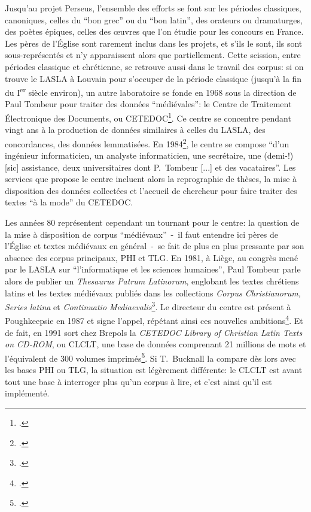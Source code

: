 Jusqu'au projet Perseus, l'ensemble des efforts se font sur les périodes classiques, canoniques, celles du \enquote{bon grec} ou du \enquote{bon latin}, des orateurs ou dramaturges, des poètes épiques, celles des œuvres que l'on étudie pour les concours en France. Les pères de l'Église sont rarement inclus dans les projets, et s'ils le sont, ils sont sous-représentés et n'y apparaissent alors que partiellement. Cette scission, entre périodes classique et chrétienne, se retrouve aussi dans le travail des corpus: si on trouve le LASLA à Louvain pour s'occuper de la période classique (jusqu'à la fin du I\textsuperscript{er} siècle environ), un autre laboratoire se fonde en 1968 sous la direction de Paul Tombeur pour traiter des données \enquote{médiévales}: le Centre de Traitement Électronique des Documents, ou CETEDOC\footcite[p. 70]{gueret_analyse_1977}. Ce centre se concentre pendant vingt ans à la production de données similaires à celles du LASLA, des concordances, des données lemmatisées. En 1984\footcite{iogna-prat_centre_1984}, le centre se compose \enquote{d'un ingénieur informaticien, un analyste informaticien, une secrétaire, une (demi-!) {[sic]} assistance, deux universitaires dont P.~Tombeur {[...]} et des vacataires}. Les services que propose le centre incluent alors la reprographie de thèses, la mise à disposition des données collectées et l'accueil de chercheur pour faire traiter des textes \enquote{à la mode} du CETEDOC.

Les années 80 représentent cependant un tournant pour le centre: la question de la mise à disposition de corpus \enquote{médiévaux}~-~il faut entendre ici pères de l'Église et textes médiévaux en général~-~se fait de plus en plus pressante par son absence des corpus principaux, PHI et TLG. En 1981, à Liège, au congrès mené par le LASLA sur \enquote{l'informatique et les sciences humaines}, Paul Tombeur parle alors de publier un \textit{Thesaurus Patrum Latinorum}, englobant les textes chrétiens latins et les textes médiévaux publiés dans les collections \textit{Corpus Christianorum, Series latina} et \textit{Continuatio Mediaevalis}\footcite{tombeur_constitution_1981}. Le directeur du centre est présent à Poughkeepsie en 1987 et signe l'appel, répétant ainsi ces nouvelles ambitions\footcite{burnard_report_1988}. Et de fait, en 1991 sort chez Brepols la \textit{CETEDOC Library of Christian Latin Texts on CD-ROM}, ou CLCLT, une base de données comprenant 21 millions de mots et l'équivalent de 300 volumes imprimés\footcite[p. 90]{bucknall_review_1994}. Si T.~Bucknall la compare dès lors avec les bases PHI ou TLG, la situation est légèrement différente: le CLCLT est avant tout une base à interroger plus qu'un corpus à lire, et c'est ainsi qu'il est implémenté.

